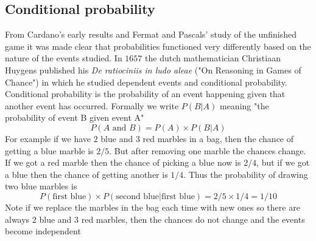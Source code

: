 \subsection{Conditional probability}
From Cardano's early results and Fermat and Pascals' study of the unfinished game it was made clear that probabilities functioned very differently based on the nature of the events studied. In $1657$ the dutch mathematician Christiaan Huygens published his \textit{De ratiociniis in ludo aleae} ("On Reasoning in Games of Chance") in which he studied dependent events and conditional probability. Conditional probability is the probability of an event happening given that another event has occurred. Formally we write $P(B|A)$ meaning "the probability of event B given event A"
\begin{equation}\label{prob:conditional-event}
P(A \text{ and } B) = P(A) \times P(B|A)
\end{equation}
For example if we have $2$ blue and $3$ red marbles in a bag, then the chance of getting a blue marble is $2/5$. But after removing one marble the chances change. If we got a red marble then the chance of picking a blue now is $2/4$, but if we got a blue then the chance of getting another is $1/4$. Thus the probability of drawing two blue marbles is 
\[
P(\text{first blue}) \times P(\text{second blue}|\text{first blue}) = 2/5 \times 1/4 = 1/10
\] 
Note if we replace the marbles in the bag each time with new ones so there are always $2$ blue and $3$ red marbles, then the chances do not change and the events become independent

